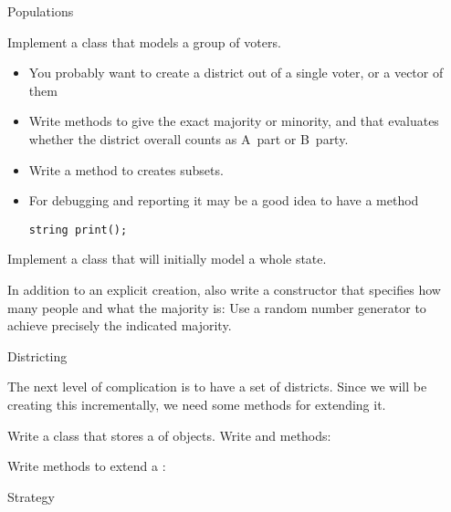  {Populations}

\begin{exercise}
  Implement a  class that models a group of voters.
  \begin{itemize}
    \item You probably want to create a district out of a single
      voter, or a vector of them
    \item Write methods  to give the exact majority or
      minority, and  that evaluates whether the district
      overall counts as A~part or B~party.
  \item Write a  method to creates subsets.
  \item For debugging and reporting it may be a good idea to have a method
\begin{verbatim}
string print();
\end{verbatim}
  \end{itemize}
\end{exercise}

\begin{exercise}
  Implement a  class that will initially model a whole state.

  In addition to an explicit creation, also write a constructor that
  specifies how many people and what the majority is:
  Use a random number generator to achieve precisely the indicated majority.
\end{exercise}

 {Districting}

The next level of complication is to have a set of districts.
Since we
will be creating this incrementally, we need some methods for
extending it.

\begin{exercise}
  Write a class  that stores a  of
   objects. Write  and  methods:
\end{exercise}

\begin{exercise}
  Write methods to extend a :
\end{exercise}

 {Strategy}

